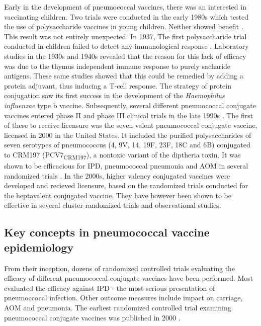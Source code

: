 \documentclass[]{book}
\theoremstyle{definition}
\theoremstyle{definition}
\theoremstyle{definition}
\theoremstyle{remark}
\begin{document}
Early in the development of pneumococcal vaccines, there was an
interested in vaccinating children. Two trials were conducted in the
early 1980s which tested the use of polysaccharide vaccines in young
children. Neither showed benefit \citep{Makela1981, Sloyer1981}. This
result was not entirely unexpected. In 1937, The first polysaccharide
trial conducted in children failed to detect any immunological response
\citep{Davies1937}. Laboratory studies in the 1930s and 1940s revealed
that the reason for this lack of efficacy was due to the thymus
independent immune response to purely sacharide antigens. These same
studies showed that this could be remedied by adding a protein adjuvant,
thus inducing a T-cell response. The strategy of protein conjugation saw
its first success in the development of the \emph{Haemophilus
influenzae} type b vaccine. Subsequently, several different pneumococcal
conjugate vaccines entered phase II and phase III clinical trials in the
late 1990s \citep{Austrian1999a}. The first of these to receive
licensure was the seven valent pneumococcal conjugate vaccine, licensed
in 2000 in the United States. It included the purified polysaccharides
of seven serotypes of pneumococcus (4, 9V, 14, 19F, 23F, 18C and 6B)
conjugated to CRM197 (PCV7\textsubscript{CRM197}), a nontoxic variant of
the diptheria toxin. It was shown to be efficacious for IPD,
pneumococcal pneumonia and AOM in several randomized trials
\citep{Black2000, Black2002c, Eskola2001, Fireman2003, OBrien2003, OBrien2008}.
In the 2000s, higher valency conjugated vaccines were developed and
recieved licensure, based on the randomized trials conducted for the
heptavalent conjugated vaccine. They have however been shown to be
effective in several cluster randomized trials and observational
studies.

\subsection{Key concepts in pneumococcal vaccine
epidemiology}\label{key-concepts-in-pneumococcal-vaccine-epidemiology}

From their inception, dozens of randomized controlled trials evaluating
the efficacy of different pneumococcal conjugate vaccines have been
performed. Most evaluated the efficacy against IPD - the most serious
presentation of pneumoccocal infection. Other outcome measures include
impact on carriage, AOM and pneumonia. The earliest randomized
controlled trial examining pneumococcal conjugate vaccines was published
in 2000 \citep{Black2000}.
\end{document}
